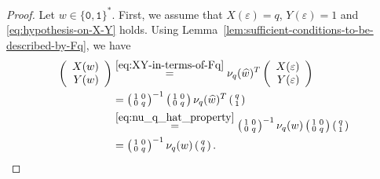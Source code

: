 \documentclass[a4paper,12pt]{amsart}
\newcommand{\0}{\mathtt{0}}
\newcommand{\1}{\mathtt{1}}
\newcommand{\2}{\mathtt{2}}
\newcommand{\3}{\mathtt{3}}
\begin{document}
\begin{proof}
    Let $w\in\{\0,\1\}^*$.
    First, we assume that $X(\varepsilon)=q$, $Y(\varepsilon)=1$ and
    \eqref{eq:hypothesis-on-X-Y} holds.
    Using Lemma~\ref{lem:sufficient-conditions-to-be-described-by-Fq},
    we have
    \begin{align*}
            \left(\begin{array}{r}
                X(w)\\
                Y(w)
            \end{array}\right)
        &\overset{\eqref{eq:XY-in-terms-of-Fq}}{=}
        \nu_q(\widehat{w})^T
        \left(\begin{array}{r} X(\varepsilon)\\ Y(\varepsilon) \end{array}\right)\\
            &=
        \left(\begin{smallmatrix} 1 & 0 \\ 0 & q \end{smallmatrix}\right)^{-1}
        \left(\begin{smallmatrix} 1 & 0 \\ 0 & q \end{smallmatrix}\right)
        \nu_q(\widehat{w})^T
        \left(\begin{smallmatrix} q \\ 1 \end{smallmatrix}\right)\\
        &\overset{\eqref{eq:nu_q_hat_property}}{=}
        \left(\begin{smallmatrix} 1 & 0 \\ 0 & q \end{smallmatrix}\right)^{-1}
        \nu_q(w)
        \left(\begin{smallmatrix} 1 & 0 \\ 0 & q \end{smallmatrix}\right)
        \left(\begin{smallmatrix} q \\ 1 \end{smallmatrix}\right)\\
        &=
        \left(\begin{smallmatrix} 1 & 0 \\ 0 & q \end{smallmatrix}\right)^{-1}
        \nu_q(w)
        \left(\begin{smallmatrix} q \\ q \end{smallmatrix}\right).
    \end{align*}


\end{proof}
\end{document}
